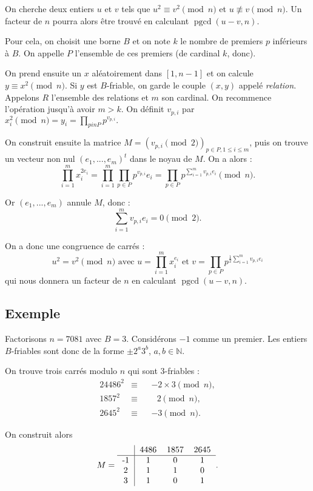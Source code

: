 \documentclass[french, 12pt, titlepage]{article}
\DeclareMathOperator{\pgcd}{pgcd}
\begin{document}
On cherche deux entiers $u$ et $v$ tels que $u^2 \equiv v^2 \pmod n$ et $u
\nequiv v \pmod n.$ Un facteur de $n$ pourra alors être trouvé en calculant
$\pgcd(u - v, n).$

Pour cela, on choisit une borne $B$ et on note $k$ le nombre de
premiers $p$ inférieurs à $B.$ On appelle $P$ l'ensemble de ces
premiers (de cardinal $k$, donc).

On prend ensuite un $x$ aléatoirement dans $[1, n - 1]$ et
on calcule $y \equiv x^2 \pmod n.$ Si $y$ est $B$-friable, on garde le
couple $(x, y)$ appelé \textit{relation}. Appelons $R$ l'ensemble des
relations et $m$ son cardinal. On recommence l'opération jusqu'à
avoir $m > k.$ On définit $v_{p, i}$ par $x_i^2 \pmod n = y_i = \prod\limits_{p in P} p^{v_{p, i}}.$

On construit ensuite la matrice $M = (v_{p, i} \pmod 2)_{p \in P, 1
  \leq i \leq m}$, puis on trouve un vecteur non nul $(e_1, ..., e_m)^t$
dans le noyau de $M.$
On a alors : \[\prod\limits_{i=1}^m x_i^{2e_i} = \prod\limits_{i=1}^m
\prod\limits_{p \in P} p^{v_{p, i}}e_i = \prod\limits_{p \in P}
p^{\sum\limits_{i=1}^m v_{p, i}e_i} \pmod n.\]

Or $(e_1, ..., e_m)$ annule $M$, donc : \[\sum\limits_{i=1}^m v_{p,
  i}e_i = 0 \pmod 2.\]

On a donc une congruence de carrés : \[u^2 = v^2 \pmod n \text{ avec } u =
\prod\limits_{i=1}^m x_i^{e_i} \text{ et } v = \prod\limits_{p \in P}
p^{\frac{1}{2} \sum\limits_{i=1}^m v_{p, i}e_i}\] qui nous donnera un facteur
de $n$ en calculant $\pgcd(u - v, n).$

\subsection{Exemple}

Factorisons $n = 7081$ avec $B = 3.$ Considérons $-1$ comme un
premier. Les entiers $B$-friables sont donc de la forme $\pm2^a3^b$,
$a, b \in \mathbb{N}.$ 

On trouve trois carrés modulo $n$ qui sont 3-friables :
\begin{alignat*}{2}
4486^2 & \equiv && -\!2 \times 3 \pmod n, \\
1857^2 & \equiv && \text{ } 2 \pmod n, \\
2645^2 & \equiv && -\!3 \pmod n.
\end{alignat*}

On construit alors \[M = \begin{tabular}{c|ccc}
                            & 4486 & 1857 & 2645 \\
                           \hline
                           -1 & 1 & 0 & 1 \\
                           2 & 1 & 1 & 0 \\
                           3 & 1 & 0 & 1 \\
                         \end{tabular}.\]
\end{document}
